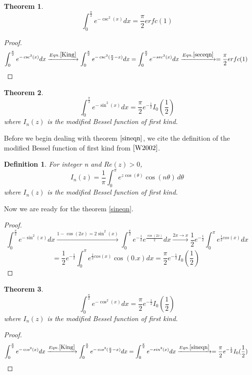 \documentclass[a4paper,twoside,10pt]{article}
\newtheorem{theorem}{Theorem}[section]
\newtheorem{definition}{Definition}
\begin{document}
 \begin{theorem}
\begin{equation}\label{csceqn}
\int_0^{\frac{\pi}{2}} e^{-\csc^2(x)} dx = \frac{\pi}{2}erfc(1)  
\end{equation}
\end{theorem}
\begin{proof}
\[ \int_0^{\frac{\pi}{2}} e^{-\csc^2(x)} dx \xrightarrow{Eqn. \eqref{King}}\int_0^{\frac{\pi}{2}} e^{-\csc^2(\frac{\pi}{2}-x)} dx = \int_0^{\frac{\pi}{2}} e^{-sec^2(x)} dx \xrightarrow{Eqn. \eqref{seceqn}}= \frac{\pi}{2} erfc(1)  \,\,   \]
\end{proof}

 \begin{theorem}
\begin{equation}\label{sineqn}
 \int_0^{\frac{\pi}{2}} e^{-\sin^2(x)} dx =\frac{\pi}{2}e^{-\frac{1}{2}} I_0(\frac{1}{2})  
\end{equation}
where    $I_n(z)  $ is the modified Bessel function of first kind. 
\end{theorem}

Before we begin dealing with theorem   $\eqref{sineqn}  $, we cite the definition of the modified Bessel function of first kind from   \(\cite{W2002}\).

\begin{definition}
For integer n and   $Re(z)>0  $,
\begin{equation} \label{Besselfirst}
 I_n(z) = \frac{1}{\pi} \int_0^{\pi} e^{z \cos(\theta)} \cos(n\theta) \, d\theta 
\end{equation}
where   $I_n(z)  $ is the modified Bessel function of first kind.
\end{definition}
Now we are ready for the theorem \eqref{sineqn}. \\
\begin{proof}
\[ \int_0^{\frac{\pi}{2}} e^{-\sin^2(x)} dx \xrightarrow{1-\cos(2x)=2\sin^2(x)}  \int_0^{\frac{\pi}{2}} e^{-\frac{1}{2}} e^{\frac{\cos(2x)}{2}} dx \xrightarrow{2x \rightarrow x} \frac{1}{2}e^{-\frac{1}{2}} \int_0^{\pi} e^{\frac{1}{2}cos(x)} dx \]
\[ = \frac{1}{2}e^{-\frac{1}{2}} \int_0^{\pi} e^{\frac{1}{2}cos(x)} \cos(0.x) dx = \frac{\pi}{2}e^{-\frac{1}{2}} I_0\left(\frac{1}{2}\right)  \,\,   \]
\end{proof}

\begin{theorem}
\begin{equation}\label{coseqn}
 \int_0^{\frac{\pi}{2}} e^{-\cos^2(x)} dx =\frac{\pi}{2}e^{-\frac{1}{2}} I_0\left(\frac{1}{2}\right)   
\end{equation}
where    $I_n(z)  $ is the modified Bessel function of first kind.  \\
\end{theorem}
\begin{proof}
\[ \int_0^{\frac{\pi}{2}} e^{-\cos^2(x)} dx \xrightarrow{Eqn.  \eqref{King}}\int_0^{\frac{\pi}{2}} e^{-\cos^2(\frac{\pi}{2}-x)} dx = \int_0^{\frac{\pi}{2}} e^{-sin^2(x)} dx \xrightarrow{Eqn. \eqref{sineqn}}= \frac{\pi}{2}e^{-\frac{1}{2}} I_0(\frac{1}{2})  \,\,   \] 
\end{proof}
\end{document}
